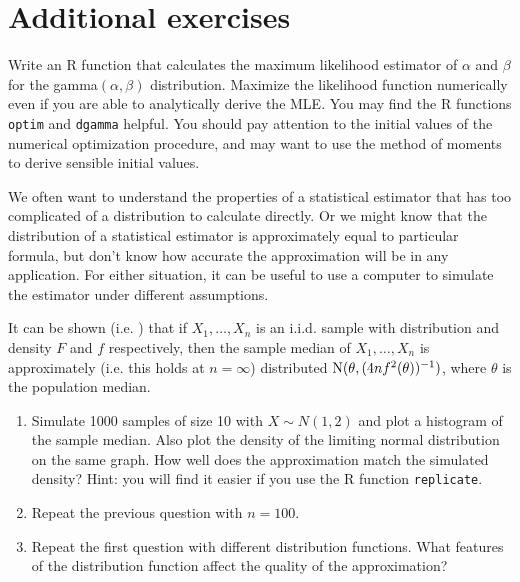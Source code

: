 

\section{Additional exercises}

\begin{hw}
  Write an R function that calculates the maximum likelihood
  estimator of $\alpha$ and $\beta$ for the gamma$(\alpha,\beta)$
  distribution. Maximize the likelihood function numerically even if
  you are able to analytically derive the MLE. You may find the R
  functions \texttt{optim} and \texttt{dgamma} helpful. You should
  pay attention to the initial values of the numerical optimization
  procedure, and may want to use the method of moments to derive
  sensible initial values.
\end{hw}

\begin{hw}
  We often want to understand the properties of a statistical
  estimator that has too complicated of a distribution to calculate
  directly. Or we might know that the distribution of a statistical
  estimator is approximately equal to particular formula, but don't
  know how accurate the approximation will be in any application. For
  either situation, it can be useful to use a computer to simulate the
  estimator under different assumptions.

  It can be shown (i.e. \citet[p. 483]{CB02}) that if $X_1,\dots,X_n$
  is an i.i.d. sample with distribution and density $F$ and $f$
  respectively, then the sample median of $X_1,\dots,X_n$ is
  approximately (i.e. this holds at $n = \infty$) distributed $\operatorname{N}(\theta,
  (4 n f^2(\theta))^{-1})$, where $\theta$ is the population median.
  \begin{enumerate}
  \item Simulate 1000 samples of size 10 with $X \sim N(1,2)$ and plot
    a histogram of the sample median. Also plot the density of the
    limiting normal distribution on the same graph. How well does the
    approximation match the simulated density? Hint: you will find it
    easier if you use the R function \texttt{replicate}.
  \item Repeat the previous question with $n=100$.
  \item Repeat the first question with different distribution
    functions. What features of the distribution function affect the
    quality of the approximation?
  \end{enumerate}
\end{hw}

